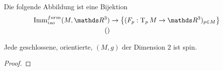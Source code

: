 \begin{Lemm}
	Die folgende Abbildung ist eine Bijektion
	\begin{align*}
		\Immfi{M}{\R^3} &\rightarrow \sset{ (\abb{F_p}{\T_pM}{\R^3})_{p\in M} }\\
		()
	\end{align*}
\end{Lemm}


\begin{Satz}
	Jede geschlossene, orientierte, \RMF  $(M,g)$ der Dimension $2$ ist spin.
	\begin{proof}
	\end{proof}
\end{Satz}


